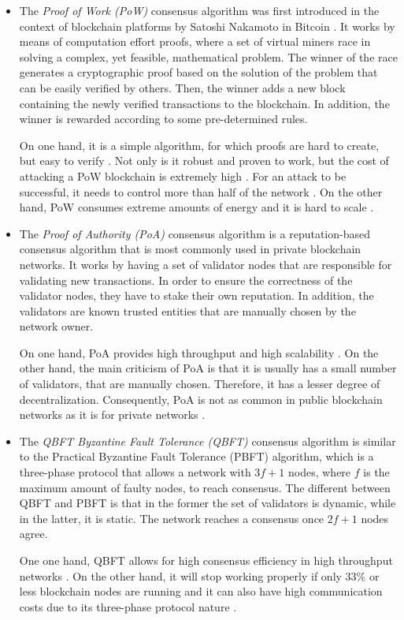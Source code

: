 \begin{itemize}
    \item The \textit{Proof of Work (PoW)} \cite{finney} consensus algorithm was first introduced in the context of blockchain platforms by Satoshi Nakamoto in Bitcoin \cite{nakamoto2009bitcoin}. It works by means of computation effort proofs, where a set of virtual miners race in solving a complex, yet feasible, mathematical problem. The winner of the race generates a cryptographic proof based on the solution of the problem that can be easily verified by others. Then, the winner adds a new block containing the newly verified transactions to the blockchain. In addition, the winner is rewarded according to some pre-determined rules.
    
    On one hand, it is a simple algorithm, for which proofs are hard to create, but easy to verify \cite{li_blockchain_2021}. Not only is it robust and proven to work, but the cost of attacking a PoW blockchain is extremely high \cite{li_blockchain_2021}. For an attack to be successful, it needs to control more than half of the network \cite{li_blockchain_2021}. On the other hand, PoW consumes extreme amounts of energy and it is hard to scale \cite{edwood_2020, li_blockchain_2021, ccaf}.
    
    \item The \textit{Proof of Authority (PoA)} \cite{szilagyi_2017} consensus algorithm is a reputation-based consensus algorithm that is most commonly used in private blockchain networks. It works by having a set of validator nodes that are responsible for validating new transactions. In order to ensure the correctness of the validator nodes, they have to stake their own reputation. In addition, the validators are known trusted entities that are manually chosen by the network owner.
    
    On one hand, PoA provides high throughput and high scalability \cite{binance_academy_2020}. On the other hand, the main criticism of PoA is that it is usually has a small number of validators, that are manually chosen. Therefore, it has a lesser degree of decentralization. Consequently, PoA is not as common in public blockchain networks as it is for private networks \cite{bPoA}.

    \item The \textit{QBFT Byzantine Fault Tolerance (QBFT)} \cite{10.48550/arxiv.2002.03613} consensus algorithm is similar to the Practical Byzantine Fault Tolerance (PBFT) \cite{Castro99practicalbyzantine} algorithm, which is a three-phase protocol that allows a network with $3f+1$ nodes, where $f$ is the maximum amount of faulty nodes, to reach consensus. The different between QBFT and PBFT is that in the former the set of validators is dynamic, while in the latter, it is static. The network reaches a consensus once $2f+1$ nodes agree.
    
    One one hand, QBFT allows for high consensus efficiency in high throughput networks \cite{li_blockchain_2021}. On the other hand, it will stop working properly if only 33\% or less blockchain nodes are running and it can also have high communication costs due to its three-phase protocol nature \cite{li_blockchain_2021}.
\end{itemize}

